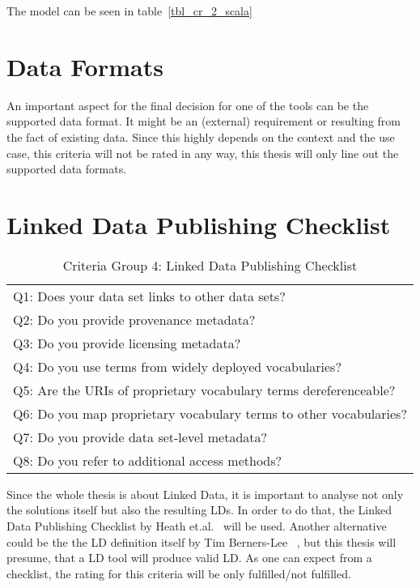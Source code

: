 The model can be seen in table~\ref{tbl_cr_2_scala}

\section{Data Formats}

An important aspect for the final decision for one of the tools can be the 
supported data format. It might be an (external) requirement or resulting from the 
fact of existing data. Since this highly depends on the context and the use case, 
this criteria will not be rated in any way, this thesis will only line out the 
supported data formats.

\section{Linked Data Publishing Checklist}

\begin{table}[htb]
\centering
\begin{tabular}{|l|}
\rowcolor[HTML]{EFEFEF} 
\hline
\multicolumn{1}{|c|}{\textbf{Criteria}}                        \\ \hline
Q1: Does your data set links to other data sets?                   \\ \hline
Q2: Do you provide provenance metadata?                            \\ \hline
Q3: Do you provide licensing metadata?                             \\ \hline
Q4: Do you use terms from widely deployed vocabularies?            \\ \hline
Q5: Are the URIs of proprietary vocabulary terms dereferenceable?  \\ \hline
Q6: Do you map proprietary vocabulary terms to other vocabularies? \\ \hline
Q7: Do you provide data set-level metadata?                        \\ \hline
Q8: Do you refer to additional access methods?                     \\ \hline
\end{tabular}
\caption{Criteria Group 4: Linked Data Publishing Checklist}
\label{tbl_cr_4_scala}
\end{table}

Since the whole thesis is about Linked Data, it is important to analyse not only 
the solutions itself but also the resulting LDs. In order to do that, the Linked 
Data Publishing Checklist by Heath et.al.~\cite{heath2011linked} will be used. 
Another alternative could be the the LD definition itself by Tim Berners-Lee~
\cite{berners2006linked}, but this thesis will presume, that a LD tool will 
produce valid LD. As one can expect from a checklist, the rating for this criteria 
will be only fulfilled/not fulfilled.

